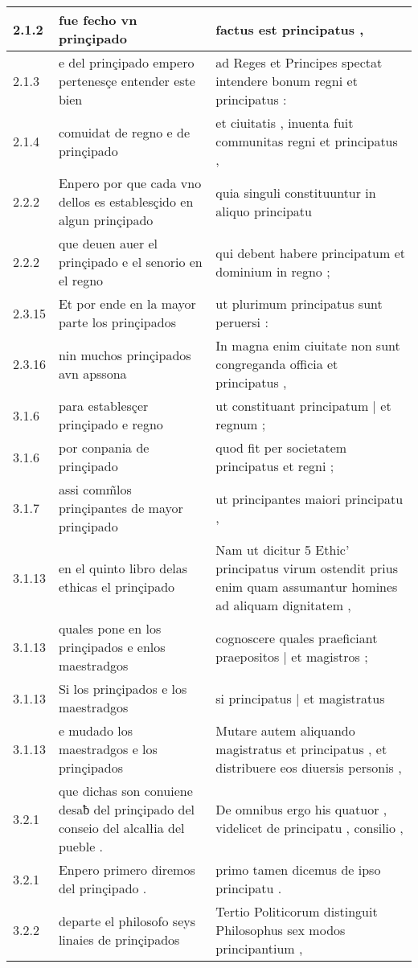 \begin{tabular}{|p{1cm}|p{6.5cm}|p{6.5cm}|}
2.1.2 & fue fecho vn prinçipado & factus est principatus , \\\hline
2.1.3 & e del prinçipado empero pertenesçe entender este bien & ad Reges et Principes spectat intendere bonum regni et principatus : \\\hline
2.1.4 & comuidat de regno e de prinçipado & et ciuitatis , inuenta fuit communitas regni et principatus , \\\hline
2.2.2 & Enpero por que cada vno dellos es establesçido en algun prinçipado & quia singuli constituuntur in aliquo principatu \\\hline
2.2.2 & que deuen auer el prinçipado e el senorio en el regno & qui debent habere principatum et dominium in regno ; \\\hline
2.3.15 & Et por ende en la mayor parte los prinçipados & ut plurimum principatus sunt peruersi : \\\hline
2.3.16 & nin muchos prinçipados avn apssona & In magna enim ciuitate non sunt congreganda officia et principatus , \\\hline
3.1.6 & para establesçer prinçipado e regno & ut constituant principatum | et regnum ; \\\hline
3.1.6 & por conpania de prinçipado & quod fit per societatem principatus et regni ; \\\hline
3.1.7 & assi comm̃los prinçipantes de mayor prinçipado & ut principantes maiori principatu , \\\hline
3.1.13 & en el quinto libro delas ethicas el prinçipado & Nam ut dicitur 5 Ethic’ principatus virum ostendit prius enim quam assumantur homines ad aliquam dignitatem , \\\hline
3.1.13 & quales pone en los prinçipados e enlos maestradgos & cognoscere quales praeficiant praepositos | et magistros ; \\\hline
3.1.13 & Si los prinçipados e los maestradgos & si principatus | et magistratus \\\hline
3.1.13 & e mudado los maestradgos e los prinçipados & Mutare autem aliquando magistratus et principatus , et distribuere eos diuersis personis , \\\hline
3.2.1 & que dichas son conuiene desaƀ del prinçipado del conseio del alcalłia del pueble . & De omnibus ergo his quatuor , videlicet de principatu , consilio , \\\hline
3.2.1 & Enpero primero diremos del prinçipado . & primo tamen dicemus de ipso principatu . \\\hline
3.2.2 & departe el philosofo seys linaies de prinçipados & Tertio Politicorum distinguit Philosophus sex modos principantium , \\\hline

\end{tabular}
